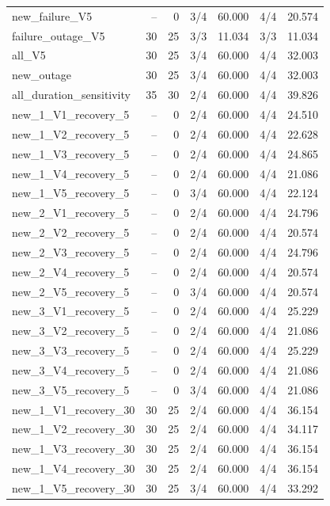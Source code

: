 \begin{longtable}{@{}p{.37\linewidth}rrrrrr@{}}
new\_failure\_V5 & -- & 0 & 3/4 & 60.000 & 4/4 & 20.574\\
failure\_outage\_V5 & 30 & 25 & 3/3 & 11.034 & 3/3 & 11.034\\
all\_V5 & 30 & 25 & 3/4 & 60.000 & 4/4 & 32.003\\
new\_outage & 30 & 25 & 3/4 & 60.000 & 4/4 & 32.003\\
all\_duration\_sensitivity & 35 & 30 & 2/4 & 60.000 & 4/4 & 39.826\\
new\_1\_V1\_recovery\_5 & -- & 0 & 2/4 & 60.000 & 4/4 & 24.510\\
new\_1\_V2\_recovery\_5 & -- & 0 & 2/4 & 60.000 & 4/4 & 22.628\\
new\_1\_V3\_recovery\_5 & -- & 0 & 2/4 & 60.000 & 4/4 & 24.865\\
new\_1\_V4\_recovery\_5 & -- & 0 & 2/4 & 60.000 & 4/4 & 21.086\\
new\_1\_V5\_recovery\_5 & -- & 0 & 3/4 & 60.000 & 4/4 & 22.124\\
new\_2\_V1\_recovery\_5 & -- & 0 & 2/4 & 60.000 & 4/4 & 24.796\\
new\_2\_V2\_recovery\_5 & -- & 0 & 2/4 & 60.000 & 4/4 & 20.574\\
new\_2\_V3\_recovery\_5 & -- & 0 & 2/4 & 60.000 & 4/4 & 24.796\\
new\_2\_V4\_recovery\_5 & -- & 0 & 2/4 & 60.000 & 4/4 & 20.574\\
new\_2\_V5\_recovery\_5 & -- & 0 & 3/4 & 60.000 & 4/4 & 20.574\\
new\_3\_V1\_recovery\_5 & -- & 0 & 2/4 & 60.000 & 4/4 & 25.229\\
new\_3\_V2\_recovery\_5 & -- & 0 & 2/4 & 60.000 & 4/4 & 21.086\\
new\_3\_V3\_recovery\_5 & -- & 0 & 2/4 & 60.000 & 4/4 & 25.229\\
new\_3\_V4\_recovery\_5 & -- & 0 & 2/4 & 60.000 & 4/4 & 21.086\\
new\_3\_V5\_recovery\_5 & -- & 0 & 3/4 & 60.000 & 4/4 & 21.086\\
new\_1\_V1\_recovery\_30 & 30 & 25 & 2/4 & 60.000 & 4/4 & 36.154\\
new\_1\_V2\_recovery\_30 & 30 & 25 & 2/4 & 60.000 & 4/4 & 34.117\\
new\_1\_V3\_recovery\_30 & 30 & 25 & 2/4 & 60.000 & 4/4 & 36.154\\
new\_1\_V4\_recovery\_30 & 30 & 25 & 2/4 & 60.000 & 4/4 & 36.154\\
new\_1\_V5\_recovery\_30 & 30 & 25 & 3/4 & 60.000 & 4/4 & 33.292\\

\end{longtable}
